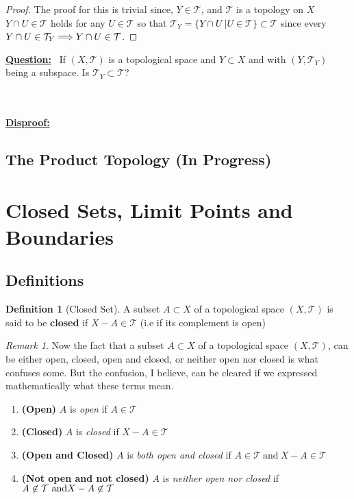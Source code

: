 \documentclass{article}
\theoremstyle{remark}
\newtheorem*{remark}{Remark}
\theoremstyle{definition}
\newtheorem{definition}{Definition}[section]
\newcommand{\simplies}{\DOTSB\Longrightarrow}
\begin{document}
\begin{proof}
The proof for this is trivial since, $Y \in \mathcal{T}$, and $\mathcal{T}$ is a topology on $X$ $Y \cap U \in \mathcal{T}$ holds for any $U \in \mathcal{T}$ so that $\mathcal{T}_Y = \{ Y \cap U \ | U \in \mathcal{T}\} \subset \mathcal{T}$ since every $Y \cap U \in  \mathcal{T}_Y \simplies Y \cap U \in  \mathcal{T}$.
\end{proof}

\smallskip \begin{flushleft}
\textbf{\underline{Question:}} \ If $(X, \mathcal{T})$ is a topological space and $Y \subset X$ and with $(Y, \mathcal{T}_Y)$ being a subspace. Is $\mathcal{T}_Y \subset \mathcal{T}$?
\end{flushleft}
\\ \\
\textbf{\underline{Disproof:}} 


\newpage
\bigskip
\subsection{The Product Topology (In Progress)}


\newpage

\section{Closed Sets, Limit Points and Boundaries}

\subsection{Definitions}

\begin{definition}[Closed Set]
A subset $A \subset X$ of a topological space $(X , \mathcal{T})$ is said to be \textbf{closed} if $X-A \in \mathcal{T}$ (i.e if its complement is open) 
\end{definition}

\begin{remark}
Now the fact that a subset $A \subset X$ of a topological space $(X, \mathcal{T})$, can be either open, closed, open and closed, or neither open nor closed is what confuses some. But the confusion, I believe, can be cleared if we expressed mathematically what these terms mean.

\begin{enumerate}
  \item \textbf{(Open)} $A$ is \textit{open} if $A \in \mathcal{T}$ 
  \item \textbf{(Closed)} $A$ is \textit{closed} if $X - A \in \mathcal{T}$
  \item \textbf{(Open and Closed)} $A$ is \textit{both open and closed} if $A \in \mathcal{T} \  \text{and} \ X - A \in \mathcal{T}$
  \item \textbf{(Not open and  not closed)} $A$ is \textit{neither open nor closed} if $A \not\in \mathcal{T} \  \text{and} \ \\X - A \not\in \mathcal{T}$ 
\end{enumerate}
\end{remark}
\end{document}
